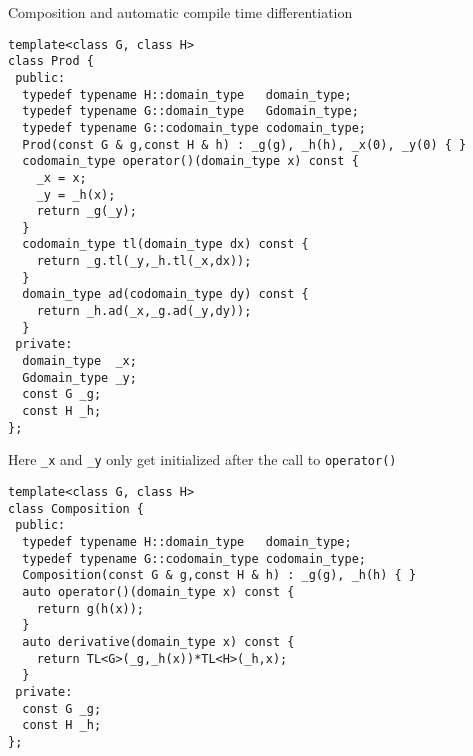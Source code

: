 \documentclass[9pt]{beamer}
\begin{document}
\begin{frame}[fragile]{Composition and automatic compile time differentiation}
\begin{lstlisting}
template<class G, class H>
class Prod {
 public:
  typedef typename H::domain_type   domain_type;
  typedef typename G::domain_type   Gdomain_type;
  typedef typename G::codomain_type codomain_type;
  Prod(const G & g,const H & h) : _g(g), _h(h), _x(0), _y(0) { }
  codomain_type operator()(domain_type x) const {
    _x = x;
    _y = _h(x); 
    return _g(_y);
  }
  codomain_type tl(domain_type dx) const {
    return _g.tl(_y,_h.tl(_x,dx));
  }
  domain_type ad(codomain_type dy) const {
    return _h.ad(_x,_g.ad(_y,dy));
  }
 private:
  domain_type  _x; 
  Gdomain_type _y; 
  const G _g;
  const H _h;
};
\end{lstlisting}


Here \lstinline|_x| and \lstinline|_y| only get initialized after the call to \lstinline|operator()|  

\end{frame}

\begin{frame}[fragile]{}

\begin{lstlisting}
template<class G, class H>
class Composition {
 public:
  typedef typename H::domain_type   domain_type;
  typedef typename G::codomain_type codomain_type;
  Composition(const G & g,const H & h) : _g(g), _h(h) { }
  auto operator()(domain_type x) const {
    return g(h(x));
  }
  auto derivative(domain_type x) const {
    return TL<G>(_g,_h(x))*TL<H>(_h,x);
  }
 private:
  const G _g;
  const H _h;
};
\end{lstlisting}




\end{frame} 


\end{document}
